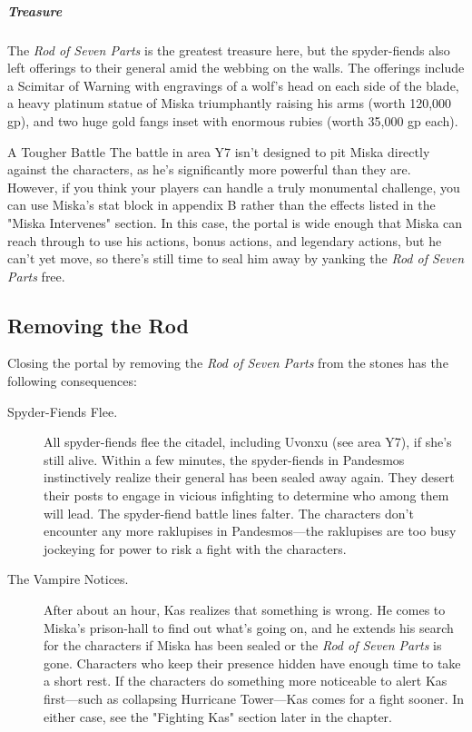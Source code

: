 \documentclass[10pt,a4paper,twoside,bg=print,twocolumn,openany,nodeprecatedcode]{dndbook}
\begin{document}
\subparagraph{Treasure}
The \textit{Rod of Seven Parts} is the greatest treasure here, but the spyder-fiends also left offerings to their general amid the webbing on the walls. The offerings include a Scimitar of Warning with engravings of a wolf's head on each side of the blade, a heavy platinum statue of Miska triumphantly raising his arms (worth 120,000 gp), and two huge gold fangs inset with enormous rubies (worth 35,000 gp each).

\begin{DndSidebar}[float=!b]{A Tougher Battle}
The battle in area Y7 isn't designed to pit Miska directly against the characters, as he's significantly more powerful than they are. However, if you think your players can handle a truly monumental challenge, you can use Miska's stat block in appendix B rather than the effects listed in the "Miska Intervenes" section. In this case, the portal is wide enough that Miska can reach through to use his actions, bonus actions, and legendary actions, but he can't yet move, so there's still time to seal him away by yanking the \textit{Rod of Seven Parts} free.



\end{DndSidebar}

\subsection{Removing the Rod}
Closing the portal by removing the \textit{Rod of Seven Parts} from the stones has the following consequences:


\begin{description}
\item[Spyder-Fiends Flee.]
All spyder-fiends flee the citadel, including Uvonxu (see area Y7), if she's still alive. Within a few minutes, the spyder-fiends in Pandesmos instinctively realize their general has been sealed away again. They desert their posts to engage in vicious infighting to determine who among them will lead. The spyder-fiend battle lines falter. The characters don't encounter any more raklupises in Pandesmos—the raklupises are too busy jockeying for power to risk a fight with the characters.
\item[The Vampire Notices.]
After about an hour, Kas realizes that something is wrong. He comes to Miska's prison-hall to find out what's going on, and he extends his search for the characters if Miska has been sealed or the \textit{Rod of Seven Parts} is gone. Characters who keep their presence hidden have enough time to take a short rest. If the characters do something more noticeable to alert Kas first—such as collapsing Hurricane Tower—Kas comes for a fight sooner. In either case, see the "Fighting Kas" section later in the chapter.
\end{description}
\end{document}
